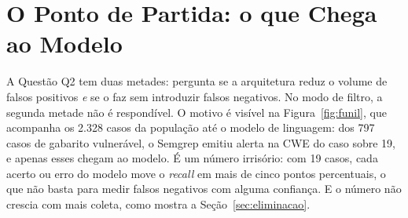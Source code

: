 \section{O Ponto de Partida: o que Chega ao Modelo}
\label{sec:partida}

A Questão Q2 tem duas metades: pergunta se a arquitetura reduz o volume de falsos positivos \textit{e} se o faz sem introduzir falsos negativos. No modo de filtro, a segunda metade não é respondível. O motivo é visível na Figura~\ref{fig:funil}, que acompanha os 2.328 casos da população até o modelo de linguagem: dos 797 casos de gabarito vulnerável, o Semgrep emitiu alerta na CWE do caso sobre 19, e apenas esses chegam ao modelo. É um número irrisório: com 19 casos, cada acerto ou erro do modelo move o \textit{recall} em mais de cinco pontos percentuais, o que não basta para medir falsos negativos com alguma confiança. E o número não crescia com mais coleta, como mostra a Seção~\ref{sec:eliminacao}.

